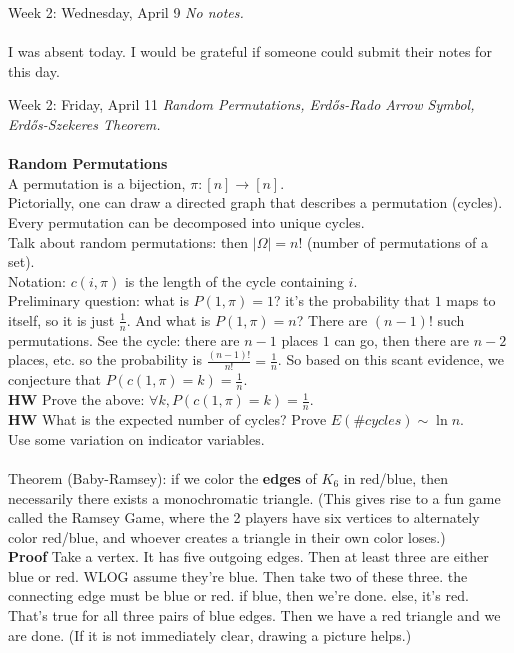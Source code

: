 \documentclass[12pt]{article}
\theoremstyle{remark}
\begin{document}
\newpage
\label{5}\begin{section}{Week 2: Wednesday, April 9}
\indent\textit{No notes.}\\\\
I was absent today. I would be grateful if someone could submit their notes for this day.
\end{section}
\newpage
\label{6}\begin{section}{Week 2: Friday, April 11}
\indent\textit{Random Permutations, Erd\H{o}s-Rado Arrow Symbol, Erd\H{o}s-Szekeres Theorem.}\\\\
\textbf{Random Permutations}
\\A permutation is a bijection, $\pi: [n] \to [n]$.
\\Pictorially, one can draw a directed graph that describes a permutation (cycles). Every permutation can be decomposed into unique cycles.
\\Talk about random permutations: then $|\Omega| = n!$ (number of permutations of a set).
\\Notation: $c(i,\pi)$ is the length of the cycle containing $i$. 
\\Preliminary question: what is $P(1,\pi) =1$? it's the probability that $1$ maps to itself, so it is just $\frac 1n$. And what is $P(1,\pi) = n$? There are $(n-1)!$ such permutations. See the cycle: there are $n-1$ places $1$ can go, then there are $n-2$ places, etc. so the probability is $\frac{(n-1)!}{n!} = \frac 1n$. So based on this scant evidence, we conjecture that $P(c(1,\pi) = k) = \frac 1n$. 
\\\textbf{HW} Prove the above: $\forall k, P(c(1,\pi)=k) = \frac 1n$.
\\\textbf{HW} What is the expected number of cycles? Prove $E(\# cycles) \sim \ln n$. 
\\Use some variation on indicator variables. 
\\\\Theorem (Baby-Ramsey): if we color the \textbf{edges} of $K_6$ in red/blue, then necessarily there exists a monochromatic triangle. (This gives rise to a fun game called the Ramsey Game, where the 2 players have six vertices to alternately color red/blue, and whoever creates a triangle in their own color loses.)
\\\textbf{Proof} Take a vertex. It has five outgoing edges. Then at least three are either blue or red. WLOG assume they're blue. Then take two of these three. the connecting edge must be blue or red. if blue, then we're done. else, it's red. That's true for all three pairs of blue edges. Then we have a red triangle and we are done. (If it is not immediately clear, drawing a picture helps.)

\end{section}
\end{document}
